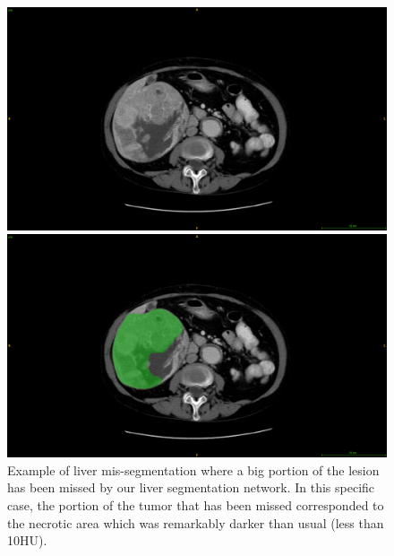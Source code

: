\begin{figure}[ht!]
	\begin{mdframed}[backgroundcolor=blue!50,linecolor=blue!50]
		\centering
		\begin{minipage}{0.45\linewidth}
			\includegraphics[width=\linewidth]{images/MisSegmentations/TCGA-DD-A1EB_slice16_raw}
		\end{minipage} \hspace{-0.1cm}
		\begin{minipage}{0.45\linewidth}
			\includegraphics[width=\linewidth]{images/MisSegmentations/TCGA-DD-A1EB_slice16_liverPrediction_Cmap}
		\end{minipage}
		\caption{Example of liver mis-segmentation where a big portion of the lesion has been missed by our liver segmentation network. In this specific case, the portion of the tumor that has been missed corresponded to the necrotic area which was remarkably darker than usual (less than 10HU).}
		\label{fig:LITS_networkMisSeg_tumor}
	\end{mdframed}
\end{figure}

